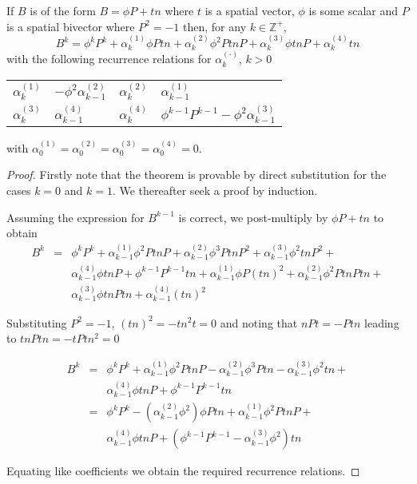 \begin{lemma}
\label{lem:bk}
If $B$ is of the form $B=\phi P+tn$ where 
$t$ is a spatial vector, $\phi$ is some scalar and $P$ is a spatial bivector
where $P^2 = -1$ then, for any $k \in \mathbb{Z}^+$, 
\[
B^{k}=\phi^k P^{k}+\alpha _{k}^{(1)}\phi Ptn+
\alpha _{k}^{(2)}\phi^2 PtnP+\alpha _{k}^{(3)}\phi tnP+\alpha _{k}^{(4)}tn
\]
with the following recurrence relations for $\alpha _{k}^{(\cdot )}$,
$k>0$ 

\begin{centering}

\begin{tabular}{r@{$\ =\ $}lr@{$\ =\ $}l}
$\alpha _{k}^{(1)}$ & $- \phi^2 \alpha _{k-1}^{(2)}$ &
$\alpha _{k}^{(2)}$ & $\alpha _{k-1}^{(1)}$\\
$\alpha _{k}^{(3)}$ & $\alpha _{k-1}^{(4)}$ &
$\alpha _{k}^{(4)}$ & $\phi^{k-1}P^{k-1} - \phi^2 \alpha_{k-1}^{(3)}$
\end{tabular}

\end{centering}

\noindent with 
$\alpha _{0}^{(1)}=\alpha _{0}^{(2)}=
\alpha _{0}^{(3)}=\alpha _{0}^{(4)}=0$.
\end{lemma}
\begin{proof}
Firstly note that the theorem is provable by direct 
substitution for the cases $k=0$ and $k=1$. We thereafter seek a 
proof by induction.

Assuming the expression for $B^{k-1}$ is correct, we post-multiply
by $\phi P+tn$ to obtain
\begin{eqnarray*}
B^k & = & \phi^k P^k + \alpha_{k-1}^{(1)}\phi^2 PtnP + 
          \alpha_{k-1}^{(2)}\phi^3 PtnP^2 + \alpha_{k-1}^{(3)}\phi^2 tnP^2 + \\
    &   & \alpha_{k-1}^{(4)}\phi tnP + \phi^{k-1} P^{k-1} tn + \alpha_{k-1}^{(1)}\phi P(tn)^2 +
          \alpha_{k-1}^{(2)}\phi^2 PtnPtn + \\
    &   & \alpha_{k-1}^{(3)}\phi tnPtn +
	  \alpha_{k-1}^{(4)}(tn)^2
\end{eqnarray*}

Substituting $P^2 = -1$, $(tn)^2 = - tn^2t = 0$ and noting that
$nPt = - Ptn$ leading to $tnPtn = - tPtn^2 = 0$

\begin{eqnarray*}
B^k & = & \phi^k P^k + \alpha_{k-1}^{(1)}\phi^2 PtnP -
          \alpha_{k-1}^{(2)}\phi^3 Ptn - \alpha_{k-1}^{(3)}\phi^2 tn + \\
    &   & \alpha_{k-1}^{(4)}\phi tnP + \phi^{k-1} P^{k-1} tn \\
    & = & \phi^k P^k - (\alpha_{k-1}^{(2)}\phi^2)\phi Ptn +
          \alpha_{k-1}^{(1)}\phi^2 PtnP + \\
    &   & \alpha_{k-1}^{(4)}\phi tnP +
	  (\phi^{k-1} P^{k-1}  - \alpha_{k-1}^{(3)}\phi^2) tn
\end{eqnarray*}

Equating like coefficients we obtain the required recurrence relations.
\end{proof}

